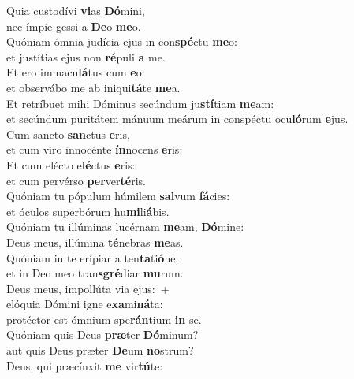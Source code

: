 \evenverse Quia custodívi \textbf{vi}as \textbf{Dó}mini,~\*\\
\evenverse nec ímpie gessi a \textbf{De}o \textbf{me}o.\\
\oddverse Quóniam ómnia judícia ejus in con\textbf{spé}ctu \textbf{me}o:~\*\\
\oddverse et justítias ejus non \textbf{ré}puli \textbf{a} me.\\
\evenverse Et ero immacu\textbf{lá}tus cum \textbf{e}o:~\*\\
\evenverse et observábo me ab iniqui\textbf{tá}te \textbf{me}a.\\
\oddverse Et retríbuet mihi Dóminus secúndum ju\textbf{stí}tiam \textbf{me}am:~\*\\
\oddverse et secúndum puritátem mánuum meárum in conspéctu ocu\textbf{ló}rum \textbf{e}jus.\\
\evenverse Cum sancto \textbf{san}ctus \textbf{e}ris,~\*\\
\evenverse et cum viro innocénte \textbf{ín}nocens \textbf{e}ris:\\
\oddverse Et cum elécto e\textbf{lé}ctus \textbf{e}ris:~\*\\
\oddverse et cum pervérso \textbf{per}ver\textbf{té}ris.\\
\evenverse Quóniam tu pópulum húmilem \textbf{sal}vum \textbf{fá}cies:~\*\\
\evenverse et óculos superbórum hu\textbf{mi}li\textbf{á}bis.\\
\oddverse Quóniam tu illúminas lucérnam \textbf{me}am, \textbf{Dó}mine:~\*\\
\oddverse Deus meus, illúmina \textbf{té}nebras \textbf{me}as.\\
\evenverse Quóniam in te erípiar a ten\textbf{ta}ti\textbf{ó}ne,~\*\\
\evenverse et in Deo meo tran\textbf{sgré}diar \textbf{mu}rum.\\
\oddverse Deus meus, impollúta via ejus:~+\\
\oddverse  elóquia Dómini igne e\textbf{xa}mi\textbf{ná}ta:~\*\\
\oddverse protéctor est ómnium spe\textbf{rán}tium \textbf{in} se.\\
\evenverse Quóniam quis Deus \textbf{præ}ter \textbf{Dó}minum?~\*\\
\evenverse aut quis Deus præter \textbf{De}um \textbf{no}strum?\\
\oddverse Deus, qui præcínxit \textbf{me} vir\textbf{tú}te:~\*\\
